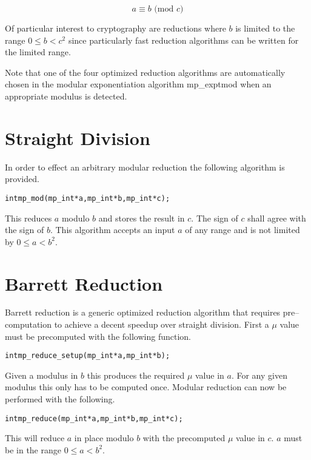 \documentclass[synpaper]{book}
\begin{document}
\begin{equation}
a \equiv b \mbox{ (mod }c\mbox{)}
\label{eqn:mod}
\end{equation}

Of particular interest to cryptography are reductions where $b$ is limited to the range $0 \le b < c^2$ since particularly
fast reduction algorithms can be written for the limited range.

Note that one of the four optimized reduction algorithms are automatically chosen in the modular exponentiation
algorithm mp\_exptmod when an appropriate modulus is detected.

\section{Straight Division}
In order to effect an arbitrary modular reduction the following algorithm is provided.

\begin{alltt}
int mp_mod(mp_int *a, mp_int *b, mp_int *c);
\end{alltt}

This reduces $a$ modulo $b$ and stores the result in $c$.  The sign of $c$ shall agree with the sign
of $b$.  This algorithm accepts an input $a$ of any range and is not limited by $0 \le a < b^2$.

\section{Barrett Reduction}

Barrett reduction is a generic optimized reduction algorithm that requires pre--computation to achieve
a decent speedup over straight division.  First a $\mu$ value must be precomputed with the following function.

\begin{alltt}
int mp_reduce_setup(mp_int *a, mp_int *b);
\end{alltt}

Given a modulus in $b$ this produces the required $\mu$ value in $a$.  For any given modulus this only has to
be computed once.  Modular reduction can now be performed with the following.

\begin{alltt}
int mp_reduce(mp_int *a, mp_int *b, mp_int *c);
\end{alltt}

This will reduce $a$ in place modulo $b$ with the precomputed $\mu$ value in $c$.  $a$ must be in the range
$0 \le a < b^2$.
\end{document}
